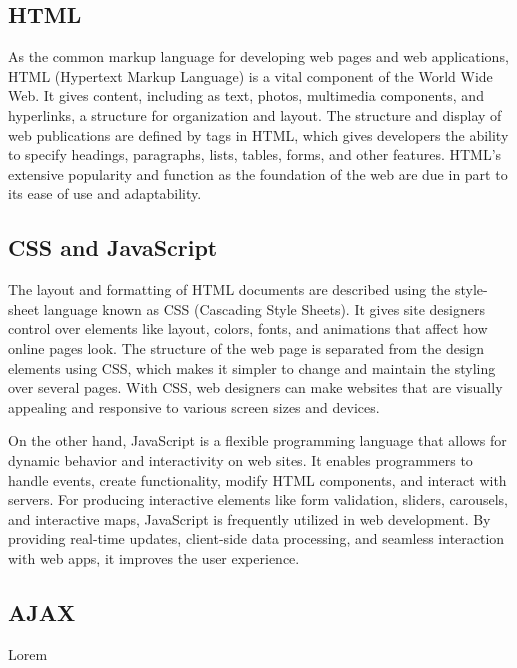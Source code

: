 \subsection{HTML}

\par As the common markup language for developing web pages and web applications, HTML (Hypertext Markup Language) is a vital component of the World Wide Web. It gives content, including as text, photos, multimedia components, and hyperlinks, a structure for organization and layout. The structure and display of web publications are defined by tags in HTML, which gives developers the ability to specify headings, paragraphs, lists, tables, forms, and other features. HTML's extensive popularity and function as the foundation of the web are due in part to its ease of use and adaptability. \cite{mozillaHTML}

\subsection{CSS and JavaScript}

\par The layout and formatting of HTML documents are described using the style-sheet language known as CSS (Cascading Style Sheets). It gives site designers control over elements like layout, colors, fonts, and animations that affect how online pages look. The structure of the web page is separated from the design elements using CSS, which makes it simpler to change and maintain the styling over several pages. With CSS, web designers can make websites that are visually appealing and responsive to various screen sizes and devices. \cite{mozillaCSS}

\par On the other hand, JavaScript is a flexible programming language that allows for dynamic behavior and interactivity on web sites. It enables programmers to handle events, create functionality, modify HTML components, and interact with servers. For producing interactive elements like form validation, sliders, carousels, and interactive maps, JavaScript is frequently utilized in web development. By providing real-time updates, client-side data processing, and seamless interaction with web apps, it improves the user experience. \cite{mozillaJS}

\subsection{AJAX}
\par Lorem \cite{}

